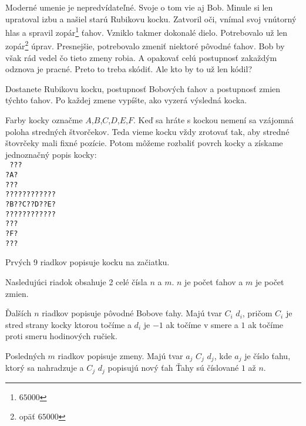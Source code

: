 





Moderné umenie je nepredvídateľné.
Svoje o tom vie aj Bob.
Minule si len upratoval izbu
a našiel starú Rubikovu kocku.
Zatvoril oči, vnímal svoj vnútorný hlas
a spravil zopár\footnote{$65000$} ťahov.
Vzniklo takmer dokonalé dielo.
Potrebovalo už len zopár\footnote{opäť $65000$} úprav.
Presnejšie, potrebovalo zmeniť niektoré pôvodné ťahov.
Bob by však rád vedel čo tieto zmeny robia.
A opakovať celú postupnosť zakaždým odznova je pracné.
Preto to treba skódiť.
Ale kto by to už len kódil?


Dostanete Rubikovu kocku, postupnosť
Bobových ťahov a postupnosť zmien týchto ťahov.
Po každej zmene vypíšte, ako vyzerá výsledná kocka.


Farby kocky označme $A$,$B$,$C$,$D$,$E$,$F$.
Keď sa hráte s kockou nemení
sa vzájomná poloha stredných štvorčekov.
Teda vieme kocku vždy zrotovať tak,
aby stredné štovrčeky mali fixné pozície.
Potom môžeme rozbaliť povrch kocky a získame
jednoznačný popis kocky:\\
\texttt{
???\\
?A?\\
???\\
????????????\\
?B??C??D??E?\\
????????????\\
???\\
?F?\\
???\\
}


Prvých 9 riadkov popisuje kocku na začiatku.

Nasledujúci riadok obsahuje 2 celé čísla $n$ a $m$.
$n$ je počet ťahov a $m$ je počet zmien.

Ďalších $n$ riadkov popisuje pôvodné Bobove ťahy.
Majú tvar $C_i$ $d_i$,
pričom $C_i$ je stred strany kocky ktorou točíme
a $d_i$ je $-1$ ak točíme v smere a 
$1$ ak točíme proti smeru hodinových ručiek.

Posledných $m$ riadkov popisuje zmeny.
Majú tvar $a_j$ $C_j$ $d_j$,
kde $a_j$ je číslo ťahu, ktorý sa nahradzuje
a $C_j$ $d_j$ popisujú nový ťah
Ťahy sú číslované $1$ až $n$.

